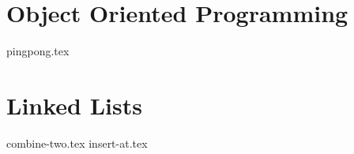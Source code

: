 \documentclass{exam}
\begin{document}
\section{Object Oriented Programming}
\begin{questions}
    {pingpong.tex}
\end{questions}

\section{Linked Lists}
\begin{questions}
    {combine-two.tex}
    {insert-at.tex}
\end{questions}
\end{document}
